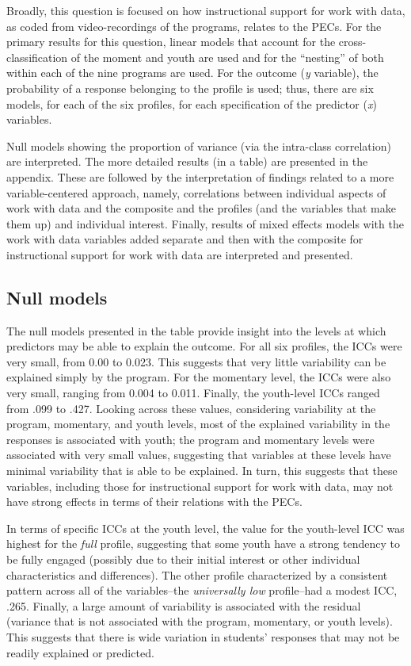\documentclass[]{book}
\theoremstyle{definition}
\theoremstyle{definition}
\theoremstyle{definition}
\theoremstyle{remark}
\begin{document}
Broadly, this question is focused on how instructional support for work
with data, as coded from video-recordings of the programs, relates to
the PECs. For the primary results for this question, linear models that
account for the cross-classification of the moment and youth are used
and for the ``nesting'' of both within each of the nine programs are
used. For the outcome (\emph{y} variable), the probability of a response
belonging to the profile is used; thus, there are six models, for each
of the six profiles, for each specification of the predictor (\emph{x})
variables.

Null models showing the proportion of variance (via the intra-class
correlation) are interpreted. The more detailed results (in a table) are
presented in the appendix. These are followed by the interpretation of
findings related to a more variable-centered approach, namely,
correlations between individual aspects of work with data and the
composite and the profiles (and the variables that make them up) and
individual interest. Finally, results of mixed effects models with the
work with data variables added separate and then with the composite for
instructional support for work with data are interpreted and presented.

\subsection{Null models}\label{null-models}

The null models presented in the table provide insight into the levels
at which predictors may be able to explain the outcome. For all six
profiles, the ICCs were very small, from 0.00 to 0.023. This suggests
that very little variability can be explained simply by the program. For
the momentary level, the ICCs were also very small, ranging from 0.004
to 0.011. Finally, the youth-level ICCs ranged from .099 to .427.
Looking across these values, considering variability at the program,
momentary, and youth levels, most of the explained variability in the
responses is associated with youth; the program and momentary levels
were associated with very small values, suggesting that variables at
these levels have minimal variability that is able to be explained. In
turn, this suggests that these variables, including those for
instructional support for work with data, may not have strong effects in
terms of their relations with the PECs.

In terms of specific ICCs at the youth level, the value for the
youth-level ICC was highest for the \emph{full} profile, suggesting that
some youth have a strong tendency to be fully engaged (possibly due to
their initial interest or other individual characteristics and
differences). The other profile characterized by a consistent pattern
across all of the variables--the \emph{universally low} profile--had a
modest ICC, .265. Finally, a large amount of variability is associated
with the residual (variance that is not associated with the program,
momentary, or youth levels). This suggests that there is wide variation
in students' responses that may not be readily explained or predicted.
\end{document}
